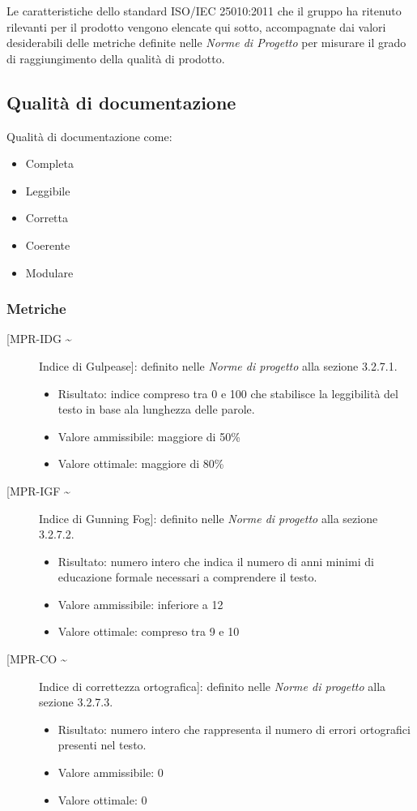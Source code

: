 \documentclass[../piano-di-qualifica.tex]{subfiles}
\begin{document}
Le caratteristiche dello standard ISO/IEC 25010:2011 che il gruppo ha ritenuto rilevanti per il prodotto vengono elencate qui sotto, accompagnate dai valori desiderabili delle metriche definite nelle \textit{Norme di Progetto} per misurare il grado di raggiungimento della qualità di prodotto.

\subsection{Qualità di documentazione}
Qualità di documentazione come:
\begin{itemize}
  \item Completa
  \item Leggibile
  \item Corretta
  \item Coerente
  \item Modulare
\end{itemize}
\subsubsection{Metriche}%
\label{par:metriche_doc}

\begin{description}
\item [[MPR-IDG \textasciitilde] Indice di Gulpease]: definito nelle \textit{Norme di progetto} alla sezione 3.2.7.1.
\begin{itemize} \item Risultato: indice compreso tra 0 e 100 che stabilisce la leggibilità del testo in base ala lunghezza delle parole. \item Valore ammissibile: maggiore di 50\% \item Valore ottimale: maggiore di 80\% \end{itemize}
\item [[MPR-IGF \textasciitilde] Indice di Gunning Fog]: definito nelle \textit{Norme di progetto} alla sezione 3.2.7.2.

\begin{itemize} \item Risultato: numero intero che indica il numero di anni minimi di educazione formale necessari a comprendere il testo. \item Valore ammissibile: \leq{}  inferiore a 12 \item Valore ottimale: \leq{}  compreso tra 9 e 10 \end{itemize}
  \item [[MPR-CO \textasciitilde] Indice di correttezza ortografica]: definito nelle \textit{Norme di progetto} alla sezione 3.2.7.3.
  \begin{itemize} \item Risultato: numero intero che rappresenta il numero di errori ortografici presenti nel testo. \item Valore ammissibile: \leq{}  0 \item Valore ottimale: \leq{}  0 \end{itemize}
\end{description}
\end{document}
